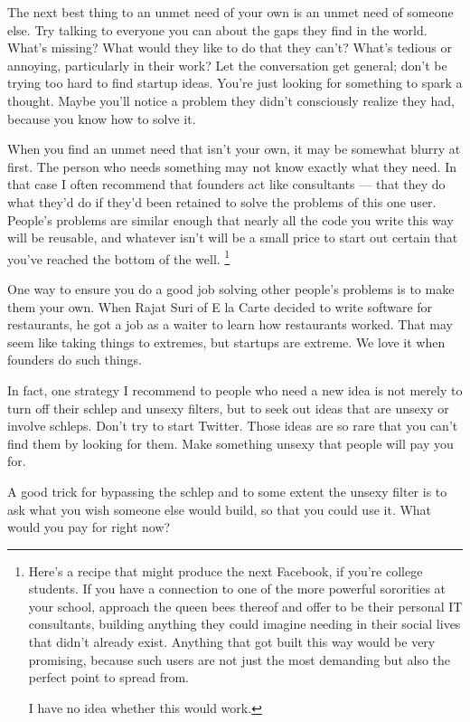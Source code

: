 The next best thing to an unmet need of your own is an unmet need of
someone else. Try talking to everyone you can about the gaps they find
in the world. What's missing? What would they like to do that they
can't? What's tedious or annoying, particularly in their work? Let the
conversation get general; don't be trying too hard to find startup
ideas. You're just looking for something to spark a thought. Maybe
you'll notice a problem they didn't consciously realize they had,
because you know how to solve it.

When you find an unmet need that isn't your own, it may be somewhat
blurry at first. The person who needs something may not know exactly
what they need. In that case I often recommend that founders act like
consultants --- that they do what they'd do if they'd been retained to
solve the problems of this one user. People's problems are similar
enough that nearly all the code you write this way will be reusable, and
whatever isn't will be a small price to start out certain that you've
reached the bottom of the well. \footnote{Here's a recipe that might produce the next Facebook, if you're
college students. If you have a connection to one of the more powerful
sororities at your school, approach the queen bees thereof and offer to
be their personal IT consultants, building anything they could imagine
needing in their social lives that didn't already exist. Anything that
got built this way would be very promising, because such users are not
just the most demanding but also the perfect point to spread from.

I have no idea whether this would work.}

One way to ensure you do a good job solving other people's problems is
to make them your own. When Rajat Suri of E la Carte decided to write
software for restaurants, he got a job as a waiter to learn how
restaurants worked. That may seem like taking things to extremes, but
startups are extreme. We love it when founders do such things.

In fact, one strategy I recommend to people who need a new idea is not
merely to turn off their schlep and unsexy filters, but to seek out
ideas that are unsexy or involve schleps. Don't try to start Twitter.
Those ideas are so rare that you can't find them by looking for them.
Make something unsexy that people will pay you for.

A good trick for bypassing the schlep and to some extent the unsexy
filter is to ask what you wish someone else would build, so that you
could use it. What would you pay for right now?

